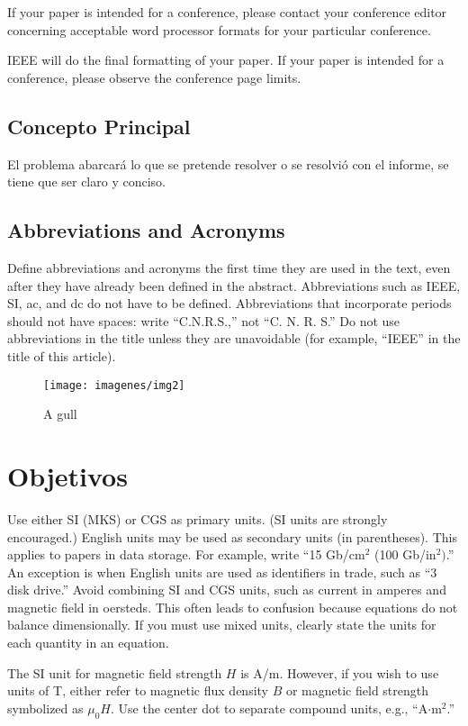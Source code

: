 \documentclass[a4paper]{IEEEtran} %
\begin{document}
If your paper is intended for a conference, please contact your conference 
editor concerning acceptable word processor formats for your particular 
conference. 

IEEE will do the final formatting of your paper. If your paper is intended 
for a conference, please observe the conference page limits. 

\subsection{Concepto Principal}

El problema abarcará lo que se pretende resolver o se resolvió con el informe, se tiene que ser claro y conciso.

\subsection{Abbreviations and Acronyms}
Define abbreviations and acronyms the first time they are used in the text, 
even after they have already been defined in the abstract. Abbreviations 
such as IEEE, SI, ac, and dc do not have to be defined. Abbreviations that 
incorporate periods should not have spaces: write ``C.N.R.S.,'' not ``C. N. 
R. S.'' Do not use abbreviations in the title unless they are unavoidable 
(for example, ``IEEE'' in the title of this article).

\begin{figure}
    \centering
        \texttt{[image: imagenes/img2]}
        \caption{A gull}
        \label{fig:gull}
\end{figure}

\section{Objetivos}
Use either SI (MKS) or CGS as primary units. (SI units are strongly 
encouraged.) English units may be used as secondary units (in parentheses). 
This applies to papers in data storage. For example, write ``15 
Gb/cm$^{2}$ (100 Gb/in$^{2})$.'' An exception is when 
English units are used as identifiers in trade, such as ``3  
disk drive.'' Avoid combining SI and CGS units, such as current in amperes 
and magnetic field in oersteds. This often leads to confusion because 
equations do not balance dimensionally. If you must use mixed units, clearly 
state the units for each quantity in an equation.

The SI unit for magnetic field strength $H$ is A/m. However, if you wish to use 
units of T, either refer to magnetic flux density $B$ or magnetic field 
strength symbolized as $\mu _{0}H$. Use the center dot to separate 
compound units, e.g., ``A$\cdot $m$^{2}$.''
\end{document}
